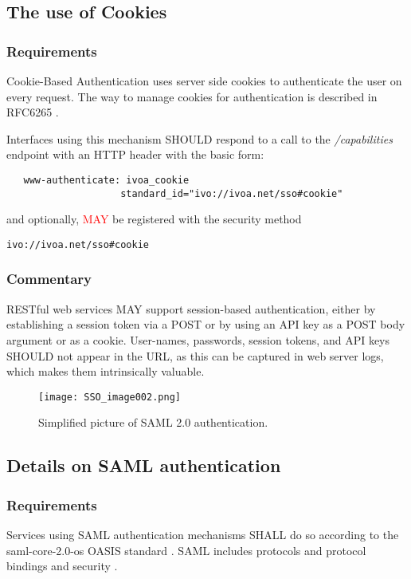 \documentclass[11pt,a4paper]{ivoa}
\begin{document}
\subsection{The use of Cookies}
\subsubsection{Requirements}
Cookie-Based Authentication uses server side cookies to authenticate the
user on every request.
The way to manage  cookies for authentication is described in RFC6265
\citep{std:RFC6265}.

Interfaces using this mechanism SHOULD respond to a call to the 
\emph{/capabilities} endpoint with an HTTP header with the basic form:
\begin{verbatim}
   www-authenticate: ivoa_cookie
                    standard_id="ivo://ivoa.net/sso#cookie"
\end{verbatim}

and optionally, \textcolor{red}{MAY} be registered with the security
method

\texttt{ivo://ivoa.net/sso\#cookie}


\subsubsection{Commentary}
RESTful web services MAY support session-based authentication, either
by establishing a session token via a POST or
by using an API key as a POST body argument or as a cookie.
User-names, passwords, session tokens, and API keys SHOULD not appear in
the URL,
as this can be captured in web server logs, which makes them
intrinsically valuable.
\begin{figure}
\centering
\texttt{[image: SSO\_image002.png]}
\caption{Simplified picture of SAML 2.0 authentication.}
\label{fig:saml}
\end{figure}

\subsection{Details on SAML authentication}
\subsubsection{Requirements}
Services using SAML authentication mechanisms SHALL do so according to
the
saml-core-2.0-os OASIS standard \citep{std:SAML}.
SAML includes protocols and protocol bindings and security
\citep{std:SAMLB}.
\end{document}
